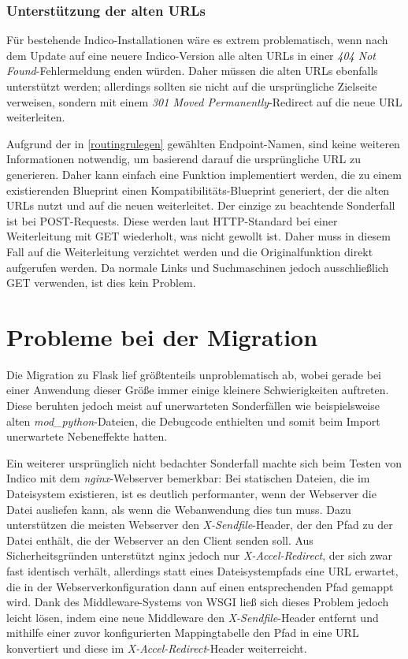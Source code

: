 \subsubsection{Unterstützung der alten URLs}

Für bestehende Indico-Installationen wäre es extrem problematisch, wenn nach dem Update auf eine
neuere Indico-Version alle alten URLs in einer \emph{404 Not Found}-Fehlermeldung enden würden.
Daher müssen die alten URLs ebenfalls unterstützt werden; allerdings sollten sie nicht auf die
ursprüngliche Zielseite verweisen, sondern mit einem \emph{301 Moved Permanently}-Redirect auf die
neue URL weiterleiten.

Aufgrund der in \autoref{routingrulegen} gewählten Endpoint-Namen, sind keine weiteren Informationen
notwendig, um basierend darauf die ursprüngliche URL zu generieren. Daher kann einfach eine Funktion
implementiert werden, die zu einem existierenden Blueprint einen Kompatibilitäts-Blueprint
generiert, der die alten URLs nutzt und auf die neuen weiterleitet. Der einzige zu beachtende
Sonderfall ist bei POST-Requests. Diese werden laut HTTP-Standard bei einer Weiterleitung mit GET
wiederholt, was nicht gewollt ist. Daher muss in diesem Fall auf die Weiterleitung verzichtet werden
und die Originalfunktion direkt aufgerufen werden. Da normale Links und Suchmaschinen jedoch
ausschließlich GET verwenden, ist dies kein Problem.


\section{Probleme bei der Migration}

Die Migration zu Flask lief größtenteils unproblematisch ab, wobei gerade bei einer Anwendung dieser
Größe immer einige kleinere Schwierigkeiten auftreten. Diese beruhten jedoch meist auf unerwarteten
Sonderfällen wie beispielsweise alten \emph{mod\_python}-Dateien, die Debugcode enthielten und somit
beim Import unerwartete Nebeneffekte hatten.

Ein weiterer ursprünglich nicht bedachter Sonderfall machte sich beim Testen von Indico mit dem
\emph{nginx}-Webserver bemerkbar: Bei statischen Dateien, die im Dateisystem existieren, ist es
deutlich performanter, wenn der Webserver die Datei ausliefen kann, als wenn die Webanwendung dies
tun muss. Dazu unterstützen die meisten Webserver den \emph{X-Sendfile}-Header, der den Pfad zu der
Datei enthält, die der Webserver an den Client senden soll. Aus Sicherheitsgründen unterstützt nginx
jedoch nur \emph{X-Accel-Redirect}, der sich zwar fast identisch verhält, allerdings statt eines
Dateisystempfads eine URL erwartet, die in der Webserverkonfiguration dann auf einen entsprechenden
Pfad gemappt wird. Dank des Middleware-Systems von WSGI ließ sich dieses Problem jedoch leicht
lösen, indem eine neue Middleware den \emph{X-Sendfile}-Header entfernt und mithilfe einer zuvor
konfigurierten Mappingtabelle den Pfad in eine URL konvertiert und diese im
\emph{X-Accel-Redirect}-Header weiterreicht.


